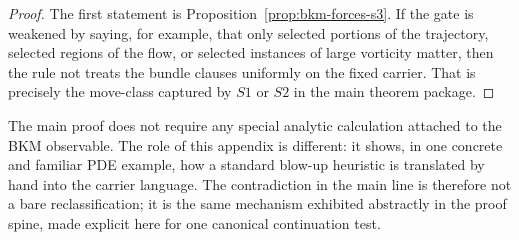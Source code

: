 \begin{proof}
The first statement is Proposition~\ref{prop:bkm-forces-s3}. If the gate is weakened by saying, for
example, that only selected portions of the trajectory, selected regions of the flow, or selected
instances of large vorticity matter, then the rule not treats the bundle clauses uniformly on the
fixed carrier. That is precisely the move-class captured by $S1$ or $S2$ in the main theorem package.
\end{proof}

\begin{remark}
The main proof does not require any special analytic calculation attached to the BKM observable. The
role of this appendix is different: it shows, in one concrete and familiar PDE example, how a standard
blow-up heuristic is translated by hand into the carrier language. The contradiction in the main line is
therefore not a bare reclassification; it is the same mechanism exhibited abstractly in the proof spine,
made explicit here for one canonical continuation test.
\end{remark}



\clearpage
